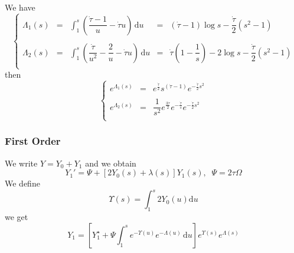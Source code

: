 \documentclass[11pt]{revtex4}
\begin{document}
We have
\begin{equation}
\left\lbrace
\begin{array}{rclcl}
\Lambda_1(s) & = &\int_{1}^s \left( \dfrac{\dot{\tau}-1}{u} - \dot{\tau} u \right) \, \mathrm{d}u & = & (\dot{\tau}-1) \log s - \dfrac{\dot{\tau}}{2}(s^2-1)\\
\\
\Lambda_2(s) & = &\int_{1}^s \left( \dfrac{\dot{\tau}}{u^2} - \dfrac{2}{u} - \dot{\tau} u \right) \, \mathrm{d}u & = & \dot{\tau}\left(1-\dfrac{1}{s}\right)-2 \log s - \dfrac{\dot{\tau}}{2}(s^2-1)\\
\end{array}
\right.
\end{equation}
then
\begin{equation}
\left\lbrace
\begin{array}{rcl}
e^{\Lambda_1(s)} & = & e^{\frac{\dot{\tau}}{2}}s^{\left(\dot{\tau}-1\right)} e^{-\frac{\dot{\tau}}{2}s^2 }\\
\\
e^{\Lambda_2(s)} & = & \dfrac{1}{s^2}e^{\frac{3\dot{\tau}}{2}} e^{-\frac{\dot{\tau}}{s}} e^{-\frac{\dot{\tau}}{2}s^2 }\\
\end{array}
\right.
\end{equation}

\subsubsection{First Order}

We write $Y=Y_0+Y_1$ and we obtain
\begin{equation}
	Y_1' = \Psi + \left[ 2 Y_0(s) + \lambda(s) \right] Y_1(s), \;\; \Psi = 2 \tau \Omega
\end{equation}
We define
\begin{equation}
	\Upsilon(s) = \int_1^s 2Y_0(u) \mathrm{d} u
\end{equation}
we get
\begin{equation}
	Y_1 = \left\lbrack Y_1^\star + \Psi \int_1^s e^{-\Upsilon(u)} e^{-\Lambda(u)} \, \mathrm{d} u  \right\rbrack e^{\Upsilon(s)} e^{\Lambda(s)}
\end{equation}
\end{document}
